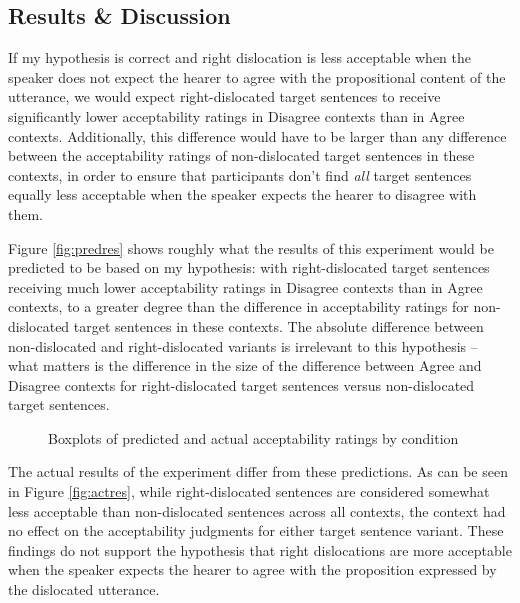 \documentclass[titlepage,12pt]{article}
\begin{document}
\subsection{Results \& Discussion}

If my hypothesis is correct and right dislocation is less acceptable when the speaker does not expect the hearer to agree with the propositional content of the utterance, we would expect right-dislocated target sentences to receive significantly lower acceptability ratings in Disagree contexts than in Agree contexts. Additionally, this difference would have to be larger than any difference between the acceptability ratings of non-dislocated target sentences in these contexts, in order to ensure that participants don't find \emph{all} target sentences equally less acceptable when the speaker expects the hearer to disagree with them. 

Figure \ref{fig:predres} shows roughly what the results of this experiment would be predicted to be based on my hypothesis: with right-dislocated target sentences receiving much lower acceptability ratings in Disagree contexts than in Agree contexts, to a greater degree than the difference in acceptability ratings for non-dislocated target sentences in these contexts. The absolute difference between non-dislocated and right-dislocated variants is irrelevant to this hypothesis -- what matters is the difference in the size of the difference between Agree and Disagree contexts for right-dislocated target sentences versus non-dislocated target sentences.

\begin{figure}[bth]
\centering
{}
\hfill
{}
\caption{Boxplots of predicted and actual acceptability ratings by condition}
\label{bytype}
\end{figure}

The actual results of the experiment differ from these predictions. As can be seen in Figure \ref{fig:actres}, while right-dislocated sentences are considered somewhat less acceptable than non-dislocated sentences across all contexts, the context had no effect on the acceptability judgments for either target sentence variant. These findings do not support the hypothesis that right dislocations are more acceptable when the speaker expects the hearer to agree with the proposition expressed by the dislocated utterance.
\end{document}
